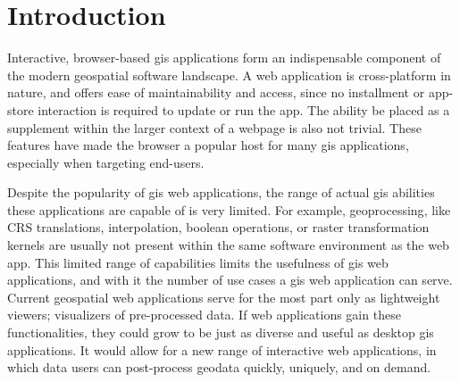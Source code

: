 

\newpage
\section{Introduction}




 

Interactive, browser-based \ac{gis} applications form an indispensable component of the modern geospatial software landscape. A web application is cross-platform in nature, and offers ease of maintainability and access, since no installment or app-store interaction is required to update or run the app. The ability be placed as a supplement within the larger context of a webpage is also not trivial. These features have made the browser a popular host for many \ac{gis} applications, especially when targeting end-users. 


Despite the popularity of \ac{gis} web applications, the range of actual \ac{gis} abilities these applications are capable of is very limited. For example, \ac{geoprocessing}, like CRS translations, interpolation, boolean operations, or raster transformation kernels are usually not present within the same software environment as the web app. This limited range of capabilities limits the usefulness of \ac{gis} web applications, and with it the number of use cases a \ac{gis} web application can serve. Current geospatial web applications serve for the most part only as lightweight viewers; visualizers of pre-processed data. If web applications gain these functionalities, they could grow to be just as diverse and useful as desktop \ac{gis} applications. It would allow for a new range of interactive web applications, in which data users can post-process geodata quickly, uniquely, and on demand.

